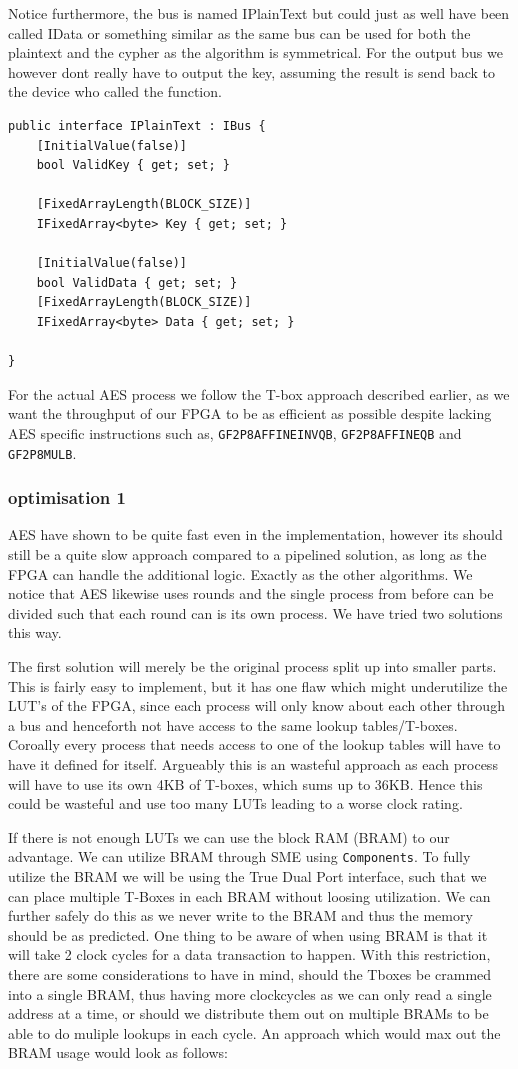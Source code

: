 \documentclass[a4paper]{article}
\begin{document}
Notice furthermore, the bus is named IPlainText but could just as well have been called IData or something similar as the same bus can be used for both the plaintext and the cypher as the algorithm is symmetrical. For the output bus we however dont really have to output the key, assuming the result is send back to the device who called the function.
\begin{verbatim}
public interface IPlainText : IBus {
    [InitialValue(false)]
    bool ValidKey { get; set; }

    [FixedArrayLength(BLOCK_SIZE)]
    IFixedArray<byte> Key { get; set; }

    [InitialValue(false)]
    bool ValidData { get; set; }
    [FixedArrayLength(BLOCK_SIZE)]
    IFixedArray<byte> Data { get; set; }

}
\end{verbatim}
For the actual AES process we follow the T-box approach described earlier, as we want the throughput of our FPGA to be as efficient as possible despite lacking AES specific instructions such as, \texttt{GF2P8AFFINEINVQB}, \texttt{GF2P8AFFINEQB} and \texttt{GF2P8MULB}.
\subsubsection{optimisation 1}
\label{AESopt}
AES have shown to be quite fast even in the implementation, however its should still be a quite slow approach compared to a pipelined solution, as long as the FPGA can handle the additional logic. Exactly as the other algorithms. We notice that AES likewise uses rounds and the single process from before can be divided such that each round can is its own process. We have tried two solutions this way.

The first solution will merely be the original process split up into smaller parts. This is fairly easy to implement, but it has one flaw which might underutilize the LUT's of the FPGA, since each process will only know about each other through a bus and henceforth not have access to the same lookup tables/T-boxes. Coroally every process that needs access to one of the lookup tables will have to have it defined for itself. Argueably this is an wasteful approach as each process will have to use its own 4KB of T-boxes, which sums up to 36KB. Hence this could be wasteful and use too many LUTs leading to a worse clock rating.

If there is not enough LUTs we can use the block RAM (BRAM) to our advantage. We can utilize BRAM through SME using \texttt{Components}. To fully utilize the BRAM we will be using the True Dual Port interface, such that we can place multiple T-Boxes in each BRAM without loosing utilization. We can further safely do this as we never write to the BRAM and thus the memory should be as predicted. One thing to be aware of when using BRAM is that it will take 2 clock cycles for a data transaction to happen. With this restriction, there are some considerations to have in mind, should the Tboxes be crammed into a single BRAM, thus having more clockcycles as we can only read a single address at a time, or should we distribute them out on multiple BRAMs to be able to do muliple lookups in each cycle. An approach which would max out the BRAM usage would look as follows:
\end{document}
